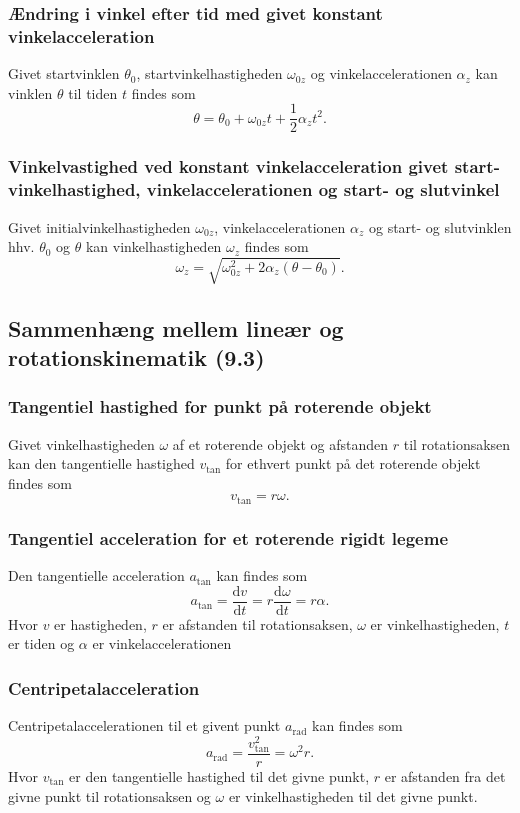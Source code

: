 \subsubsection{Ændring i vinkel efter tid med givet konstant vinkelacceleration} \label{afs:vinkonvinacc}
Givet startvinklen $\theta_0$, startvinkelhastigheden $\omega_{0z}$ og vinkelaccelerationen $\alpha_{z}$ kan vinklen $\theta$ til tiden $t$ findes som
\[ 
\theta = \theta_0 + \omega_{0z}t + \frac{1}{2}\alpha_z t^2
.\]

\subsubsection{Vinkelvastighed ved konstant vinkelacceleration givet start-vinkelhastighed, vinkelaccelerationen og start- og slutvinkel} \label{afs:vinhaskonvinaccvin}
Givet initialvinkelhastigheden $\omega_{0z}$, vinkelaccelerationen $\alpha_z$ og start- og slutvinklen hhv. $\theta_0$ og $\theta$ kan vinkelhastigheden $\omega_z$ findes som
\[ 
\omega_z = \sqrt{\omega_{0z}^2 + 2\alpha_z (\theta - \theta_0)}
.\]


\subsection{Sammenhæng mellem lineær og rotationskinematik (9.3)}

\subsubsection{Tangentiel hastighed for punkt på roterende objekt} \label{afs:tanhas}
Givet vinkelhastigheden $\omega$ af et roterende objekt og afstanden $r$ til rotationsaksen kan den tangentielle hastighed $v_{\text{tan}}$ for ethvert punkt på det roterende objekt findes som
\[ 
v_{\text{tan}} = r\omega
.\]

\subsubsection{Tangentiel acceleration for et roterende rigidt legeme} \label{afs:tanacc}
Den tangentielle acceleration $a_{\text{tan}}$ kan findes som
\[ 
a_{\text{tan}} = \frac{\mathrm{d}v}{\mathrm{d}t} = r \frac{\mathrm{d}\omega}{\mathrm{d}t} = r\alpha
.\]
Hvor $v$ er hastigheden, $r$ er afstanden til rotationsaksen, $\omega$ er vinkelhastigheden, $t$ er tiden og $\alpha$ er vinkelaccelerationen


\subsubsection{Centripetalacceleration} \label{afs:cpacc}
Centripetalaccelerationen til et givent punkt $a_{\text{rad}}$ kan findes som
\[ 
a_{\text{rad}} = \frac{v_{\text{tan}}^2}{r} = \omega^2 r
.\]
Hvor $v_{\text{tan}}$ er den tangentielle hastighed til det givne punkt, $r$ er afstanden fra det givne punkt til rotationsaksen og $\omega$ er vinkelhastigheden til det givne punkt.



